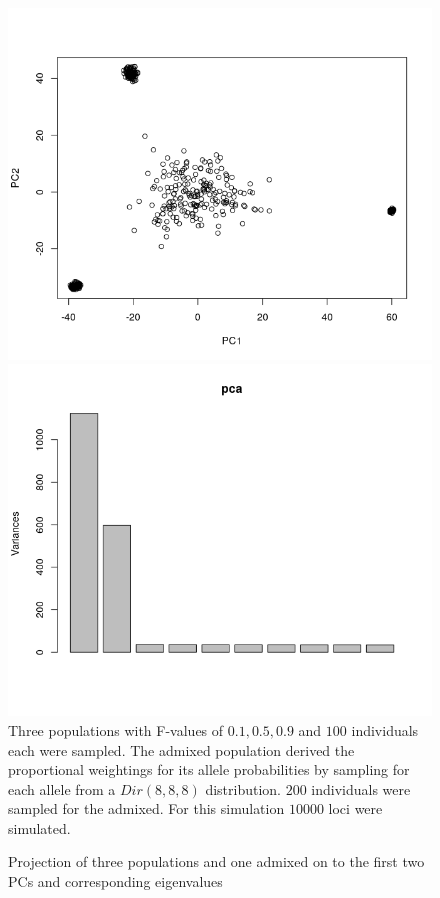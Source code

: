 \documentclass[a4paper, 11pt]{article}
\begin{document}
\begin{figure}[h!]
\centering
\caption{Projection of three populations and one admixed on to the first two PCs and corresponding eigenvalues}
\includegraphics[scale=0.42]{Rplot_projection}
\includegraphics[scale=0.41]{Rplot_eigenvalues}
\\Three populations with F-values  of $0.1, 0.5, 0.9$ and $100$ individuals each were sampled. The admixed population derived the proportional weightings for its allele probabilities by sampling for each allele from a $Dir(8, 8, 8)$ distribution. $200$ individuals were sampled for the admixed. For this simulation $10000$ loci were simulated.
\centering
\end{figure}
\end{document}

